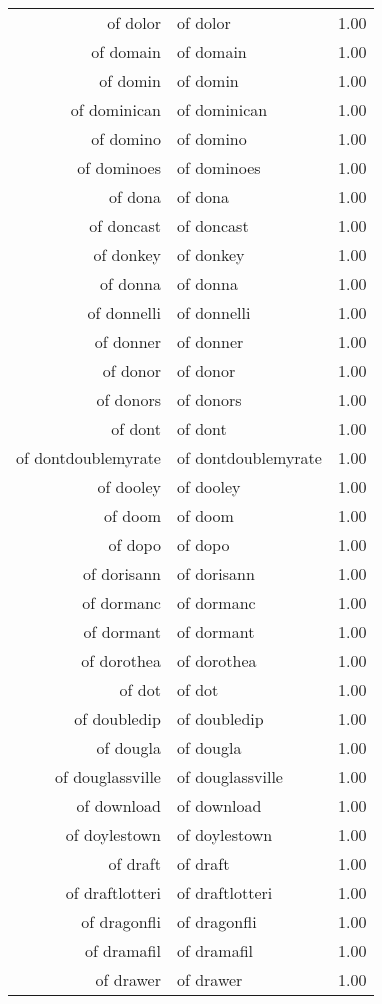 \begin{table}[ht]
\begin{tabular}{rlr}
  of dolor & of dolor & 1.00 \\ 
  of domain & of domain & 1.00 \\ 
  of domin & of domin & 1.00 \\ 
  of dominican & of dominican & 1.00 \\ 
  of domino & of domino & 1.00 \\ 
  of dominoes & of dominoes & 1.00 \\ 
  of dona & of dona & 1.00 \\ 
  of doncast & of doncast & 1.00 \\ 
  of donkey & of donkey & 1.00 \\ 
  of donna & of donna & 1.00 \\ 
  of donnelli & of donnelli & 1.00 \\ 
  of donner & of donner & 1.00 \\ 
  of donor & of donor & 1.00 \\ 
  of donors & of donors & 1.00 \\ 
  of dont & of dont & 1.00 \\ 
  of dontdoublemyrate & of dontdoublemyrate & 1.00 \\ 
  of dooley & of dooley & 1.00 \\ 
  of doom & of doom & 1.00 \\ 
  of dopo & of dopo & 1.00 \\ 
  of dorisann & of dorisann & 1.00 \\ 
  of dormanc & of dormanc & 1.00 \\ 
  of dormant & of dormant & 1.00 \\ 
  of dorothea & of dorothea & 1.00 \\ 
  of dot & of dot & 1.00 \\ 
  of doubledip & of doubledip & 1.00 \\ 
  of dougla & of dougla & 1.00 \\ 
  of douglassville & of douglassville & 1.00 \\ 
  of download & of download & 1.00 \\ 
  of doylestown & of doylestown & 1.00 \\ 
  of draft & of draft & 1.00 \\ 
  of draftlotteri & of draftlotteri & 1.00 \\ 
  of dragonfli & of dragonfli & 1.00 \\ 
  of dramafil & of dramafil & 1.00 \\ 
  of drawer & of drawer & 1.00 \\ 

\end{tabular}
\end{table}
